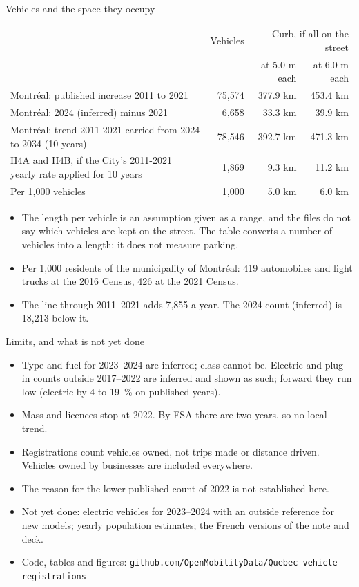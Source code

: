 \documentclass[aspectratio=169,10pt]{beamer}\usetheme{default}\usecolortheme{seahorse}\setbeamertemplate{navigation symbols}{}\setbeamertemplate{footline}[frame number]
\begin{document}
\begin{frame}{Vehicles and the space they occupy}
\small
\footnotesize\begin{tabular}{@{}p{7.4cm}rrr@{}}\toprule
 & Vehicles & \multicolumn{2}{r}{Curb, if all on the street} \\
 & & at 5.0 m each & at 6.0 m each \\\midrule
Montréal: published increase 2011 to 2021 & 75{,}574 & 377.9 km & 453.4 km \\
Montréal: 2024 (inferred) minus 2021 & 6{,}658 & 33.3 km & 39.9 km \\
Montréal: trend 2011-2021 carried from 2024 to 2034 (10 years) & 78{,}546 & 392.7 km & 471.3 km \\
H4A and H4B, if the City's 2011-2021 yearly rate applied for 10 years & 1{,}869 & 9.3 km & 11.2 km \\
Per 1,000 vehicles & 1{,}000 & 5.0 km & 6.0 km \\
\bottomrule
\end{tabular}\small
\medskip
\begin{itemize}\setlength\itemsep{3pt}
\item The length per vehicle is an assumption given as a range, and the files do not say which vehicles are kept on the street. The table converts a number of vehicles into a length; it does not measure parking.
\item Per 1{,}000 residents of the municipality of Montréal: 419 automobiles and light trucks at the 2016 Census, 426 at the 2021 Census.
\item The line through 2011--2021 adds 7{,}855 a year. The 2024 count (inferred) is 18{,}213 below it.
\end{itemize}
\end{frame}

\begin{frame}{Limits, and what is not yet done}
\begin{itemize}\setlength\itemsep{5pt}
\item Type and fuel for 2023--2024 are inferred; class cannot be. Electric and plug-in counts outside 2017--2022 are inferred and shown as such; forward they run low (electric by 4 to 19~\% on published years).
\item Mass and licences stop at 2022. By FSA there are two years, so no local trend.
\item Registrations count vehicles owned, not trips made or distance driven. Vehicles owned by businesses are included everywhere.
\item The reason for the lower published count of 2022 is not established here.
\item Not yet done: electric vehicles for 2023--2024 with an outside reference for new models; yearly population estimates; the French versions of the note and deck.
\item Code, tables and figures: \texttt{github.com/OpenMobilityData/Quebec-vehicle-registrations}
\end{itemize}
\end{frame}
\end{document}

